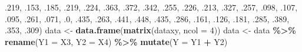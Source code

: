 \documentclass[]{article}
\newenvironment{Shaded}{\begin{snugshade}}{\end{snugshade}}
\newcommand{\KeywordTok}[1]{\textcolor[rgb]{0.13,0.29,0.53}{\textbf{#1}}}
\newcommand{\DataTypeTok}[1]{\textcolor[rgb]{0.13,0.29,0.53}{#1}}
\newcommand{\DecValTok}[1]{\textcolor[rgb]{0.00,0.00,0.81}{#1}}
\newcommand{\StringTok}[1]{\textcolor[rgb]{0.31,0.60,0.02}{#1}}
\newcommand{\OperatorTok}[1]{\textcolor[rgb]{0.81,0.36,0.00}{\textbf{#1}}}
\newcommand{\NormalTok}[1]{#1}
\begin{document}
\begin{Shaded}
\begin{Highlighting}[]
\NormalTok{           .}\DecValTok{219}\NormalTok{, .}\DecValTok{153}\NormalTok{, .}\DecValTok{185}\NormalTok{, .}\DecValTok{219}\NormalTok{, .}\DecValTok{224}\NormalTok{, .}\DecValTok{363}\NormalTok{, .}\DecValTok{372}\NormalTok{, .}\DecValTok{342}\NormalTok{,}
\NormalTok{           .}\DecValTok{255}\NormalTok{, .}\DecValTok{226}\NormalTok{, .}\DecValTok{213}\NormalTok{, .}\DecValTok{327}\NormalTok{, .}\DecValTok{257}\NormalTok{, .}\DecValTok{098}\NormalTok{, .}\DecValTok{107}\NormalTok{, .}\DecValTok{095}\NormalTok{,}
\NormalTok{           .}\DecValTok{261}\NormalTok{, .}\DecValTok{071}\NormalTok{, .}\DecValTok{0}\NormalTok{, .}\DecValTok{435}\NormalTok{, .}\DecValTok{263}\NormalTok{, .}\DecValTok{441}\NormalTok{, .}\DecValTok{448}\NormalTok{, .}\DecValTok{435}\NormalTok{,}
\NormalTok{           .}\DecValTok{286}\NormalTok{, .}\DecValTok{161}\NormalTok{, .}\DecValTok{126}\NormalTok{, .}\DecValTok{181}\NormalTok{, .}\DecValTok{285}\NormalTok{, .}\DecValTok{389}\NormalTok{, .}\DecValTok{353}\NormalTok{, .}\DecValTok{309}\NormalTok{)}
\NormalTok{data <-}\StringTok{ }\KeywordTok{data.frame}\NormalTok{(}\KeywordTok{matrix}\NormalTok{(dataxy, }\DataTypeTok{ncol =} \DecValTok{4}\NormalTok{))}
\NormalTok{data <-}\StringTok{ }\NormalTok{data }\OperatorTok{\%>\%}
\StringTok{  }\KeywordTok{rename}\NormalTok{(}\DataTypeTok{Y1 =}\NormalTok{ X3, }\DataTypeTok{Y2 =}\NormalTok{ X4) }\OperatorTok{\%>\%}
\StringTok{  }\KeywordTok{mutate}\NormalTok{(}\DataTypeTok{Y =}\NormalTok{ Y1 }\OperatorTok{+}\StringTok{ }\NormalTok{Y2)}
\end{Highlighting}
\end{Shaded}
\end{document}
